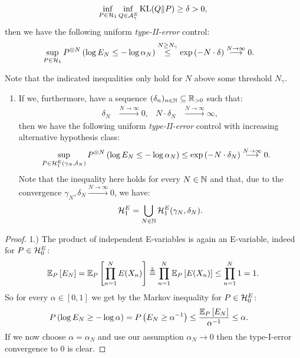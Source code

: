 \begin{Thm}
\begin{enumerate}
\begin{enumerate}
\begin{align*}
         \inf_{P \in \mathcal{H}_1} \inf_{Q \in \mathcal{A}_{\gamma}^E} \operatorname{\mathrm{KL}}(Q \|P) \ge \delta > 0,
    \end{align*}
    then we have the following uniform \emph{type-II-error} control:
 \begin{align*}
     \sup_{P \in \mathcal{H}_1}  P^{\otimes N}\left ( \log E_N \le-\log\alpha_N \right ) &   \stackrel{N \ge N_\gamma}{\le} \exp\left ( -N \cdot \delta \right ) \stackrel{N \to \infty}{\longrightarrow} 0.
 \end{align*}
\end{enumerate}
  Note that the indicated inequalities only hold for $N$ above some threshold $N_\gamma$.
  \begin{enumerate}[resume]
      \item If we, furthermore, have a sequence $(\delta_n)_{n \in \mathbb{N}} \subseteq \mathbb{R}_{>0}$ such that:
         \begin{align*} 
                 \delta_N &\stackrel{N \to \infty}{\longrightarrow} 0, &N \cdot \delta_N &\stackrel{N \to \infty}{\longrightarrow} \infty, 
         \end{align*}
       then we have the following uniform \emph{type-II-error} control with increasing alternative hypothesis class:
        \begin{align*}
            \sup_{P \in \mathcal{H}_{1}^E(\gamma_N,\delta_N)}  P^{\otimes N}\left ( \log E_N \le-\log\alpha_N \right ) & \le \exp\left ( -N \cdot \delta_N \right ) \stackrel{N \to \infty}{\longrightarrow} 0.
        \end{align*}
    Note that the inequality here holds for every $N \in \mathbb{N}$ and that, due to the convergence
    $\gamma_N,\delta_N \stackrel{N \to \infty}{\longrightarrow} 0$, we have: 
    \[ \mathcal{H}^E_1 = \bigcup_{N \in \mathbb{N}} \mathcal{H}_{1}^E(\gamma_N,\delta_N).\] 
 \end{enumerate}
\end{enumerate}
\begin{proof}
    1.) The product of independent E-variables is again an E-variable, indeed for $P \in \mathcal{H}_0^E$:
     \begin{align*}
         \mathbb{E}_P\left [ E_N \right ] =  \mathbb{E}_P\left [ \prod_{n=1}^N E(X_n) \right ] \stackrel{\operatorname*{\perp\mkern-11mu\perp}}{=} \prod_{n=1}^N \mathbb{E}_P\left [ E(X_n) \right ] \le \prod_{n=1}^N 1 = 1. 
    \end{align*}
    So for every $\alpha \in [0,1]$ we get by the Markov inequality for $P \in \mathcal{H}_0^E$:
    \begin{align*}
        P\left (\log E_N \ge -\log\alpha \right ) & = P\left (  E_N \ge \alpha^{-1} \right ) \le \frac{\mathbb{E}_P\left [ E_N \right ]}{\alpha^{-1}} \le \alpha.
    \end{align*}
    If we now choose $\alpha=\alpha_N$ and use our assumption $\alpha_N \to 0$ then the type-I-error convergence to $0$ is clear.


\end{proof}
\end{Thm}
